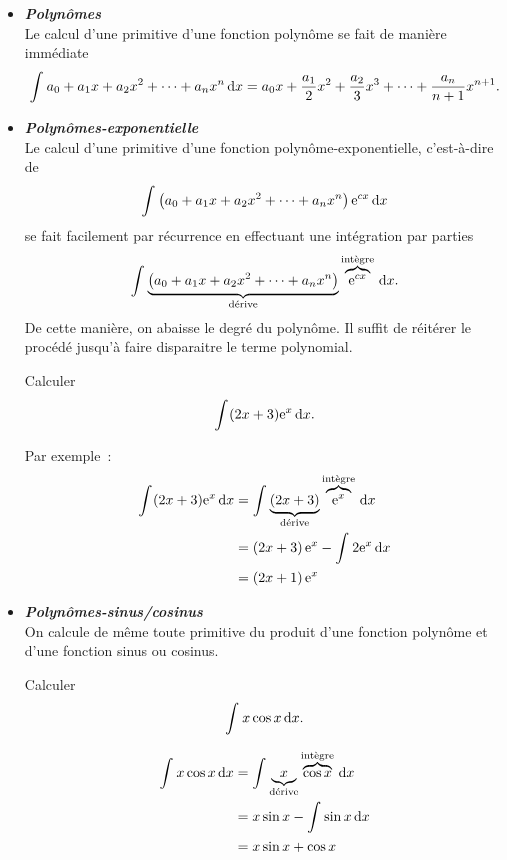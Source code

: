 \documentclass{magnolia}
\begin{document}
\begin{itemize}
\item \emph{\bf Polynômes}\\
  Le calcul d'une primitive d'une fonction polynôme se fait de manière
  immédiate
  $$\int_{}^{} a_0+a_1 x+a_2 x^2+\dots+a_n x^n\,\text{d}x=
    a_0 x+\frac{a_1}{2}x^2+\frac{a_2}{3}x^3+\dots+\frac{a_n}{n+1}x^{n+1}.$$
\item \emph{\bf Polynômes-exponentielle}\\
  Le calcul d'une primitive d'une fonction polynôme-exponentielle,
  c'est-à-dire de
  $$\int_{}^{} \left(a_0+a_1 x+a_2 x^2+\dots+a_n x^n\right){\rm e}^{cx}\,\text{d}x$$
  se fait facilement par récurrence en effectuant une intégration par
  parties
  $$\int_{}^{} \underbrace{\left(a_0+a_1 x+a_2 x^2+\dots+a_n x^n\right)}_{\text{d\'erive}} \overbrace{{\rm e}^{cx}}^{\text{int\`egre}}\,\text{d}x.$$
  De cette manière, on abaisse le degré du polynôme. Il suffit de réitérer
  le procédé jusqu'à faire disparaitre le terme polynomial.
  \begin{exoUnique}
  \exo Calculer
    \[\int_{}^{} (2x+3){\rm e}^x\,\text{d}x.\]
    \begin{sol}
  Par exemple~:
  \begin{equation*}
  \begin{split}
  \int_{}^{} (2x+3){\rm e}^x\,\text{d}x&=\int_{}^{} \underbrace{\left(2x+3\right)}_{\text{d\'erive}} \overbrace{{\rm e}^x}^{\text{int\`egre}}\,\text{d}x\\
                     &=\left(2x+3\right){\rm e}^x-\int_{}^{} 2{\rm e}^x\,\text{d}x\\
                     &=\left(2x+1\right){\rm e}^x
  \end{split}
  \end{equation*}
    \end{sol}
  \end{exoUnique}
\item \emph{\bf Polynômes-sinus/cosinus}\\
  On calcule de même toute primitive du produit d'une fonction polynôme
  et d'une fonction sinus ou cosinus.
  \begin{exoUnique}
  \exo Calculer
    \[\int_{}^{} x\cos x\,\text{d}x.\]
    \begin{sol}
  \begin{equation*}
  \begin{split}
  \int_{}^{} x\cos x\,\text{d}x&=\int_{}^{} \underbrace{x}_{\text{d\'erive}} \overbrace{\cos x}^{\text{int\`egre}}\,\text{d}x\\
                   &=x\sin x-\int_{}^{} \sin x\,\text{d}x\\
                   &=x\sin x+\cos x    
  \end{split}
  \end{equation*}
    \end{sol}
  \end{exoUnique}

\end{itemize}
\end{document}
